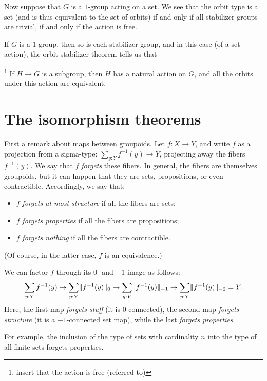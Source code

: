 Now suppose that $G$ is a $1$-group acting on a set.
We see that the orbit type is a set
(and is thus equivalent to the set of orbits)
if and only if
all stabilizer groups are trivial,
\ie if and only if the action is free.

If $G$ is a $1$-group,
then so is each stabilizer-group,
and in this case (of a set-action),
the orbit-stabilizer theorem
tells us that 

\begin{theorem}\footnote{insert that the action is free (referred to)}
\label{thm:lagrange}
  If $H \to G$ is a subgroup, then $H$ has a natural action on $G$,
  and all the orbits under this action are equivalent.
\end{theorem}


\section{The isomorphism theorems}
\label{sec:noether-theorems}

First a remark about maps between groupoids.
Let $f : X \to Y$, and write $f$ as a projection from a sigma-type:
$\sum_{y:Y} f^{-1}(y) \to Y$,
projecting away the fibers $f^{-1}(y)$.
We say that $f$ \emph{forgets} these fibers.
In general, the fibers are themselves groupoids,
but it can happen that they are sets, propositions, or even contractible.
Accordingly, we say that:
\begin{itemize}
\item $f$ \emph{forgets at most structure} if all the fibers are sets;
\item $f$ \emph{forgets properties} if all the fibers are propositions;
\item $f$ \emph{forgets nothing} if all the fibers are contractible.
\end{itemize}
(Of course, in the latter case, $f$ is an equivalence.)

We can factor $f$ through its $0$- and $-1$-image as follows:
\[
  \sum_{y:Y} f^{-1}(y) \to
  \sum_{y:Y} \lVert f^{-1}(y)\rVert_0 \to
  \sum_{y:Y} \lVert f^{-1}(y)\rVert_{-1} \to
  \sum_{y:Y} \lVert f^{-1}(y)\rVert_{-2} = Y.
\]
Here, the first map \emph{forgets stuff} (it is $0$-connected),
the second map \emph{forgets structure} (it is a $-1$-connected set map),
while the last \emph{forgets properties}.

For example, the inclusion of the type of sets with cardinality
$n$ into the type of all finite sets
forgets properties.

